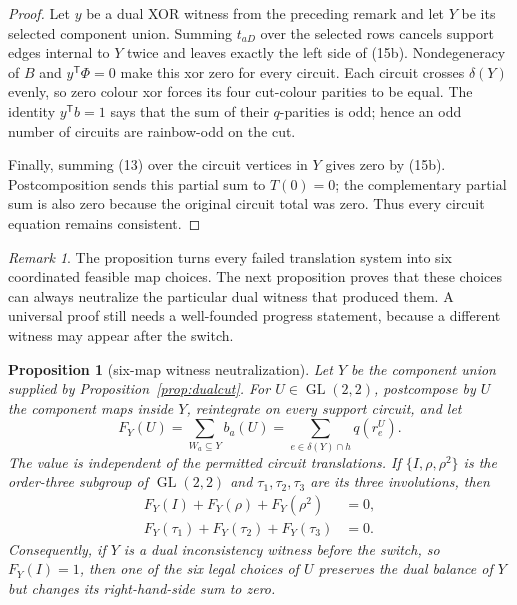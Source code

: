 \documentclass[11pt]{article}
\newtheorem{proposition}[theorem]{Proposition}
\theoremstyle{definition}
\theoremstyle{remark}
\newtheorem{remark}[theorem]{Remark}
\begin{document}
\begin{proof}
Let \(y\) be a dual XOR witness from the preceding remark and let \(Y\)
be its selected component union.  Summing \(t_{aD}\) over the selected
rows cancels support edges internal to \(Y\) twice and leaves exactly
the left side of (15b).  Nondegeneracy of \(B\) and
\(y^{\mathsf T}\Phi=0\) make this xor zero for every circuit.  Each
circuit crosses \(\delta(Y)\) evenly, so zero colour xor forces its four
cut-colour parities to be equal.  The identity
\(y^{\mathsf T}b=1\) says that the sum of their \(q\)-parities is odd;
hence an odd number of circuits are rainbow-odd on the cut.

Finally, summing (13) over the circuit vertices in \(Y\) gives zero by
(15b).  Postcomposition sends this partial sum to \(T(0)=0\); the
complementary partial sum is also zero because the original circuit
total was zero.  Thus every circuit equation remains consistent.
\end{proof}

\begin{remark}
The proposition turns every failed translation system into six
coordinated feasible map choices.  The next proposition proves that these
choices can always neutralize the particular dual witness that produced
them.  A universal proof still needs a well-founded progress statement,
because a different witness may appear after the switch.
\end{remark}

\begin{proposition}[six-map witness neutralization]
\label{prop:sixmapneutralization}
Let \(Y\) be the component union supplied by
Proposition~\ref{prop:dualcut}.  For
\(U\in\operatorname{GL}(2,2)\), postcompose by \(U\) the component maps
inside \(Y\), reintegrate on every support circuit, and let
\[
 F_Y(U)=
 \sum_{W_a\subseteq Y} b_a(U)
 =
 \sum_{e\in\delta(Y)\cap h}q(r_e^U).                    \tag{15c}
\]
The value is independent of the permitted circuit translations.  If
\(\{I,\rho,\rho^2\}\) is the order-three subgroup of
\(\operatorname{GL}(2,2)\) and
\(\tau_1,\tau_2,\tau_3\) are its three involutions, then
\[
\begin{aligned}
 F_Y(I)+F_Y(\rho)+F_Y(\rho^2)&=0,\\
 F_Y(\tau_1)+F_Y(\tau_2)+F_Y(\tau_3)&=0.
\end{aligned}                                           \tag{15d}
\]
Consequently, if \(Y\) is a dual inconsistency witness before the switch,
so \(F_Y(I)=1\), then one of the six legal choices of \(U\) preserves the
dual balance of \(Y\) but changes its right-hand-side sum to zero.
\end{proposition}
\end{document}
